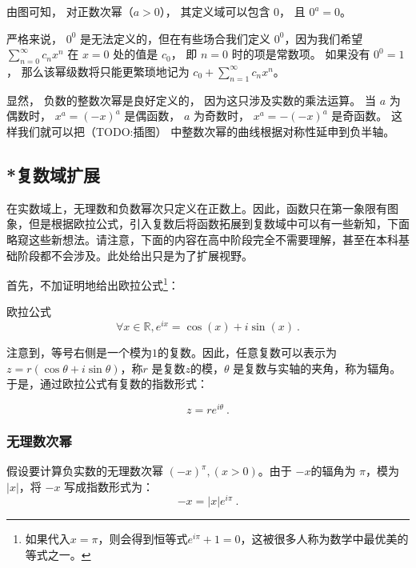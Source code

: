 由图可知， 对正数次幂（$a > 0$）， 其定义域可以包含 $0$， 且 $0^a = 0$。

严格来说， $0^0$ 是无法定义的，但在有些场合我们定义 $0^0$，因为我们希望 $\sum_{n=0}^\infty c_n x^n$ 在 $x = 0$ 处的值是 $c_0$， 即 $n=0$ 时的项是常数项。 如果没有 $0^0 = 1$， 那么该幂级数将只能更繁琐地记为 $c_0 + \sum_{n=1}^\infty c_n x^n$。


显然， 负数的整数次幂是良好定义的， 因为这只涉及实数的乘法运算。 当 $a$ 为偶数时， $x^a = (-x)^a$ 是偶函数， $a$ 为奇数时， $x^a = -(-x)^a$ 是奇函数。 这样我们就可以把（TODO:插图） 中整数次幂的曲线根据对称性延申到负半轴。




\subsection{*复数域扩展}

在实数域上，无理数和负数幂次只定义在正数上。因此，函数只在第一象限有图象，但是根据欧拉公式，引入复数后将函数拓展到复数域中可以有一些新知，下面略窥这些新想法。请注意，下面的内容在高中阶段完全不需要理解，甚至在本科基础阶段都不会涉及。此处给出只是为了扩展视野。

首先，不加证明地给出欧拉公式\footnote{如果代入$x=\pi$，则会得到恒等式$e^{i\pi}+1=0$，这被很多人称为数学中最优美的等式之一。}：

\begin{theorem}{欧拉公式}
\begin{equation}
\forall x\in\mathbb{R},e^{ix} = \cos(x) + i\sin(x)~.
\end{equation}
\end{theorem}

注意到，等号右侧是一个模为$1$的复数。因此，任意复数可以表示为 $z = r (\cos \theta + i \sin \theta)$，称$r$ 是复数$z$的模，$\theta$ 是复数与实轴的夹角，称为辐角。于是，通过欧拉公式有复数的指数形式：

\begin{equation}
z = r e^{i\theta}~.
\end{equation}

\subsubsection{无理数次幂}

假设要计算负实数的无理数次幂 $(-x)^\pi,(x>0)$。由于 $-x$的辐角为 $\pi$，模为$|x|$，将 $-x$ 写成指数形式为：
\begin{equation}
-x = |x| e^{i\pi}~.
\end{equation}

